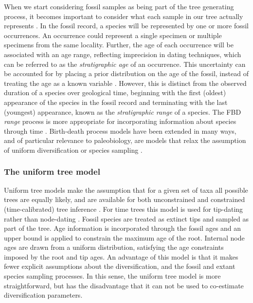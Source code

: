 \documentclass[11pt]{article}
\begin{document}
When we start considering fossil samples as being part of the tree generating process, it becomes important to consider what each sample in our tree actually represents \cite{Hopkins2018}. 
In the fossil record, a species will be represented by one or more fossil occurrences.
An occurrence could represent a single specimen or multiple specimens from the same locality.
Further, the age of each occurrence will be associated with an age range, reflecting imprecision in dating techniques, which can be referred to as the \textit{stratigraphic age} of an occurrence.
This uncertainty can be accounted for by placing a prior distribution on the age of the fossil, instead of treating the age as a known variable \cite{Drummond2016,BaridoSottani2019a}.
However, this is distinct from the observed duration of a species over geological time, beginning with the first (oldest) appearance of the species in the fossil record and terminating with the last (youngest) appearance, known as the \textit{stratigraphic range} of a species.
The FBD \textit{range} process is more appropriate for incorporating information about species through time \cite{Stadler2017}.
Birth-death process models have been extended in many ways, and of particular relevance to paleobiology, are models that relax the assumption of uniform diversification or species sampling \cite{Hoehna2011,Stadler2013b,Gavryushkina2014,Zhang2016,Kuehnert2016,BaridoSottani2018}.

\subsubsection{The uniform tree model}

Uniform tree models make the assumption that for a given set of taxa all possible trees are equally likely, and are available for both unconstrained and constrained (time-calibrated) tree inference \cite{Huelsenbeck2001a,Ronquist2012a}.
For time trees this model is used for tip-dating rather than node-dating \cite{Ronquist2012a}.
Fossil species are treated as extinct tips and sampled as part of the tree.
Age information is incorporated through the fossil ages and an upper bound is applied to constrain the maximum age of the root.
Internal node ages are drawn from a uniform distribution, satisfying the age constraints imposed by the root and tip ages.
An advantage of this model is that it makes fewer explicit assumptions about the diversification, and the fossil and extant species sampling processes. 
In this sense, the  uniform tree model is more straightforward, but has the disadvantage that it can not be used to co-estimate diversification parameters.
\end{document}
